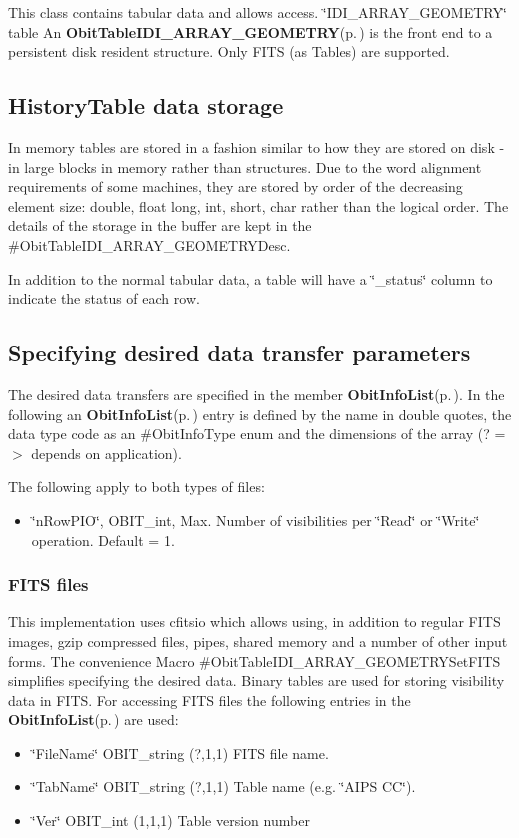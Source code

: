 This class contains tabular data and allows access. \char`\"{}IDI\_\-ARRAY\_\-GEOMETRY\char`\"{} table An {\bf Obit\-Table\-IDI\_\-ARRAY\_\-GEOMETRY}{\rm (p.\,\pageref{structObitTableIDI__ARRAY__GEOMETRY})} is the front end to a persistent disk resident structure. Only FITS (as Tables) are supported.\subsection{History\-Table data storage}\label{ObitTableWX_8h_TableDataStorage}
In memory tables are stored in a fashion similar to how they are stored on disk - in large blocks in memory rather than structures. Due to the word alignment requirements of some machines, they are stored by order of the decreasing element size: double, float long, int, short, char rather than the logical order. The details of the storage in the buffer are kept in the \#Obit\-Table\-IDI\_\-ARRAY\_\-GEOMETRYDesc.

In addition to the normal tabular data, a table will have a \char`\"{}\_\-status\char`\"{} column to indicate the status of each row.\subsection{Specifying desired data transfer parameters}\label{ObitTableIDI__ARRAY__GEOMETRY_8h_ObitTableIDI_ARRAY_GEOMETRYSpecification}
The desired data transfers are specified in the member {\bf Obit\-Info\-List}{\rm (p.\,\pageref{structObitInfoList})}. In the following an {\bf Obit\-Info\-List}{\rm (p.\,\pageref{structObitInfoList})} entry is defined by the name in double quotes, the data type code as an \#Obit\-Info\-Type enum and the dimensions of the array (? =$>$ depends on application).

The following apply to both types of files: \begin{itemize}
\item \char`\"{}n\-Row\-PIO\char`\"{}, OBIT\_\-int, Max. Number of visibilities per \char`\"{}Read\char`\"{} or \char`\"{}Write\char`\"{} operation. Default = 1.\end{itemize}
\subsubsection{FITS files}\label{ObitTableWX_8h_TableFITS}
This implementation uses cfitsio which allows using, in addition to regular FITS images, gzip compressed files, pipes, shared memory and a number of other input forms. The convenience Macro \#Obit\-Table\-IDI\_\-ARRAY\_\-GEOMETRYSet\-FITS simplifies specifying the desired data. Binary tables are used for storing visibility data in FITS. For accessing FITS files the following entries in the {\bf Obit\-Info\-List}{\rm (p.\,\pageref{structObitInfoList})} are used: \begin{itemize}
\item \char`\"{}File\-Name\char`\"{} OBIT\_\-string (?,1,1) FITS file name. \item \char`\"{}Tab\-Name\char`\"{} OBIT\_\-string (?,1,1) Table name (e.g. \char`\"{}AIPS CC\char`\"{}). \item \char`\"{}Ver\char`\"{} OBIT\_\-int (1,1,1) Table version number\end{itemize}
